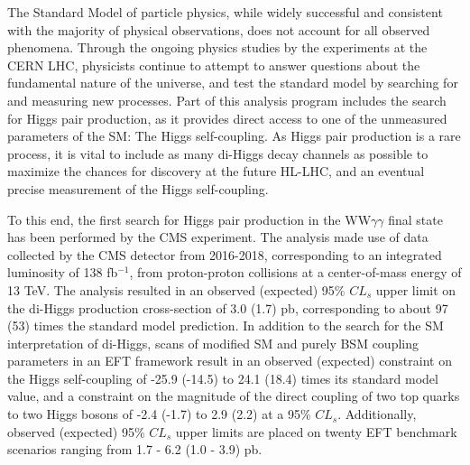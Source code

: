 The Standard Model of particle physics, while widely successful and consistent with the majority of physical observations, does not account for all observed phenomena. Through the ongoing physics studies by the experiments at the CERN LHC, physicists continue to attempt to answer questions about the fundamental nature of the universe, and test the standard model by searching for and measuring new processes. Part of this analysis program includes the search for Higgs pair production, as it provides direct access to one of the unmeasured parameters of the SM: The Higgs self-coupling. As Higgs pair production is a rare process, it is vital to include as many di-Higgs decay channels as possible to maximize the chances for discovery at the future HL-LHC, and an eventual precise measurement of the Higgs self-coupling.

To this end, the first search for Higgs pair production in the WW$\gamma\gamma$ final state has been performed by the CMS experiment. The analysis made use of data collected by the CMS detector from 2016-2018, corresponding to an integrated luminosity of 138 \unit{fb}$^{-1}$, from proton-proton collisions at a center-of-mass energy of 13 TeV. The analysis resulted in an observed (expected) 95\% $CL_{s}$ upper limit on the di-Higgs production cross-section of 3.0 (1.7) pb, corresponding to about 97 (53) times the standard model prediction. In addition to the search for the SM interpretation of di-Higgs, scans of modified SM and purely BSM coupling parameters in an EFT framework result in an observed (expected) constraint on the Higgs self-coupling of -25.9 (-14.5) to 24.1 (18.4) times its standard model value, and a constraint on the magnitude of the direct coupling of two top quarks to two Higgs bosons of -2.4 (-1.7) to 2.9 (2.2) at a 95\% $CL_{s}$. Additionally, observed (expected) 95\% $CL_{s}$ upper limits are placed on twenty EFT benchmark scenarios ranging from 1.7 - 6.2 (1.0 - 3.9) pb.

